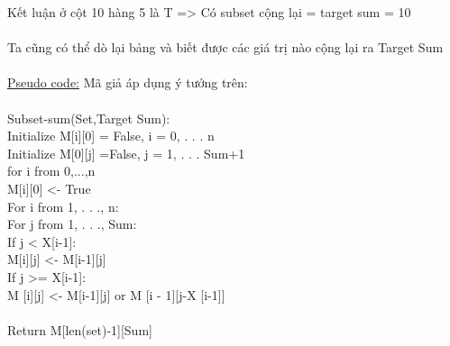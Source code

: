 \documentclass{article}
\begin{document}
    Kết luận ở cột 10 hàng 5 là T => Có subset cộng lại = target sum = 10\\\\
    Ta cũng có thể dò lại bảng và biết được các giá trị nào cộng lại ra Target Sum
    \\
    \\
    \underline{Pseudo code:} Mã giả áp dụng ý tưởng trên:\\\\
    Subset-sum(Set,Target Sum):\\
	\hspace*{0.8cm}Initialize M[i][0] = False, i = 0, . . . n\\
	\hspace*{0.8cm}Initialize M[0][j] =False, j = 1, . . . Sum+1\\
	\hspace*{0.8cm}for i from 0,...,n\\
	\hspace*{0.8cm}\hspace*{0.8cm} M[i][0] <- True\\
	\hspace*{0.8cm}For i from 1, . . ., n:\\
		\hspace*{0.8cm}\hspace{0.8cm}For j from 1, . . ., Sum:\\
			\hspace*{0.8cm}\hspace{0.8cm}\hspace{0.8cm}If j < X[i-1]:\\
				\hspace*{0.8cm}\hspace{0.8cm}\hspace{0.8cm}\hspace{0.8cm}M[i][j] <- M[i-1][j]\\
			\hspace*{0.8cm}\hspace{0.8cm}\hspace{0.8cm}If j >= X[i-1]:\\
				\hspace*{0.8cm}\hspace{0.8cm}\hspace{0.8cm}\hspace{0.8cm}M [i][j] <- M[i-1][j] or 
    M [i - 1][j-X [i-1]]\\\\
	\hspace*{0.8cm}Return M[len(set)-1][Sum]\\\\
	
\end{document}

